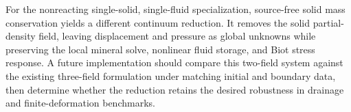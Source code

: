 \documentclass[11pt]{article}
\begin{document}
For the nonreacting single-solid, single-fluid specialization, source-free
solid mass conservation yields a different continuum reduction.  It removes the
solid partial-density field, leaving displacement and pressure as global
unknowns while preserving the local mineral solve, nonlinear fluid storage,
and Biot stress response.  A future implementation should compare this
two-field system against the existing three-field formulation under matching
initial and boundary data, then determine whether the reduction retains the
desired robustness in drainage and finite-deformation benchmarks.



\end{document}
